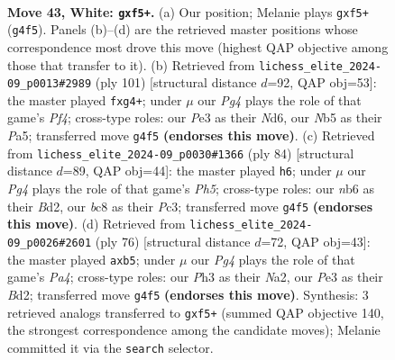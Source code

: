 \documentclass[11pt]{article}
\begin{document}
\clearpage

\begin{figure}[p]\centering
\begin{subfigure}{0.46\textwidth}\centering
\resizebox{\linewidth}{!}{%
\newchessgame
\chessboard[
  setfen={1nb2b2/1p6/1n4k1/pN1p1pp1/6Pp/PP2P2P/4PK2/2BB4 w - - 1 43},
  showmover=false,
  pgfstyle=straightmove, color=movearrow, markmove={g4-f5}
]}
\caption{}
\end{subfigure}\hfill
\begin{subfigure}{0.46\textwidth}\centering
\resizebox{\linewidth}{!}{%
\newchessgame
\chessboard[
  setfen={3b4/8/2knpp1p/p2p1p1P/3P1PP1/1P1BPK2/4N3/8 b - - 0 51},
  showmover=false,
  pgfstyle=straightmove, color=movearrow, markmove={f5-g4}
]}
\caption{}
\end{subfigure}
\\[4pt]
\begin{subfigure}{0.46\textwidth}\centering
\resizebox{\linewidth}{!}{%
\newchessgame
\chessboard[
  setfen={4k3/4n3/1n2ppp1/1p1p3P/2pP2P1/2P2PK1/2PBB3/8 w - - 1 43},
  showmover=false,
  pgfstyle=straightmove, color=movearrow, markmove={h5-h6}
]}
\caption{}
\end{subfigure}\hfill
\begin{subfigure}{0.46\textwidth}\centering
\resizebox{\linewidth}{!}{%
\newchessgame
\chessboard[
  setfen={1n6/3k4/p2bp1p1/1p1p3p/PP1Pp3/4P1PP/N2B1P2/5K2 w - - 0 39},
  showmover=false,
  pgfstyle=straightmove, color=movearrow, markmove={a4-b5}
]}
\caption{}
\end{subfigure}
\caption{\textbf{Move 43, White: \texttt{gxf5+}.} (a) Our position; Melanie plays \texttt{gxf5+} (\texttt{g4f5}). Panels (b)--(d) are the retrieved master positions whose correspondence most drove this move (highest QAP objective among those that transfer to it). (b) Retrieved from \texttt{lichess\_elite\_2024-09\_p0013\#2989} (ply 101) [structural distance $d$=92, QAP obj=53]: the master played \texttt{fxg4+}; under $\mu$ our \emph{Pg4} plays the role of that game's \emph{Pf4}; cross-type roles: our \emph{P}e3 as their \emph{N}d6, our \emph{N}b5 as their \emph{P}a5; transferred move \texttt{g4f5} \textbf{(endorses this move)}. (c) Retrieved from \texttt{lichess\_elite\_2024-09\_p0030\#1366} (ply 84) [structural distance $d$=89, QAP obj=44]: the master played \texttt{h6}; under $\mu$ our \emph{Pg4} plays the role of that game's \emph{Ph5}; cross-type roles: our \emph{n}b6 as their \emph{B}d2, our \emph{b}c8 as their \emph{P}c3; transferred move \texttt{g4f5} \textbf{(endorses this move)}. (d) Retrieved from \texttt{lichess\_elite\_2024-09\_p0026\#2601} (ply 76) [structural distance $d$=72, QAP obj=43]: the master played \texttt{axb5}; under $\mu$ our \emph{Pg4} plays the role of that game's \emph{Pa4}; cross-type roles: our \emph{P}h3 as their \emph{N}a2, our \emph{P}e3 as their \emph{B}d2; transferred move \texttt{g4f5} \textbf{(endorses this move)}. Synthesis: 3 retrieved analogs transferred to \texttt{gxf5+} (summed QAP objective 140, the strongest correspondence among the candidate moves); Melanie committed it via the \texttt{search} selector.}
\label{fig:thought-m84}
\end{figure}
\end{document}
